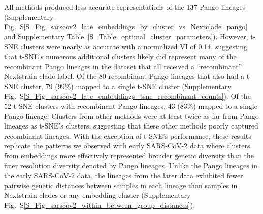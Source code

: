 \documentclass[webpdf,contemporary,large,single]{oup-authoring-template}%
\theoremstyle{thmstyleone}%
\theoremstyle{thmstyletwo}%
\theoremstyle{thmstylethree}%
\begin{document}
All methods produced less accurate representations of the 137 Pango lineages (Supplementary Fig.~S\ref{S_Fig_sarscov2_late_embeddings_by_cluster_vs_Nextclade_pango} and Supplementary Table~\ref{S_Table_optimal_cluster_parameters}).
However, t-SNE clusters were nearly as accurate with a normalized VI of 0.14, suggesting that t-SNE's numerous additional clusters likely did represent many of the recombinant Pango lineages in the dataset that all received a ``recombinant'' Nextstrain clade label.
Of the 80 recombinant Pango lineages that also had a t-SNE cluster, 79 (99\%) mapped to a single t-SNE cluster (Supplementary Fig.~S\ref{S_Fig_sarscov2_late_embeddings_tsne_recombinant_counts}).
Of the 52 t-SNE clusters with recombinant Pango lineages, 43 (83\%) mapped to a single Pango lineage.
Clusters from other methods were at least twice as far from Pango lineages as t-SNE's clusters, suggesting that these other methods poorly captured recombinant lineages.
With the exception of t-SNE's performance, these results replicate the patterns we observed with early SARS-CoV-2 data where clusters from embeddings more effectively represented broader genetic diversity than the finer resolution diversity denoted by Pango lineages.
Unlike the Pango lineages in the early SARS-CoV-2 data, the lineages from the later data exhibited fewer pairwise genetic distances between samples in each lineage than samples in Nextstrain clades or any embedding cluster (Supplementary Fig.~S\ref{S_Fig_sarscov2_within_between_group_distances}).
\end{document}
